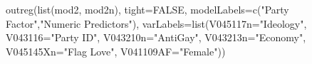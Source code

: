 \begin{Schunk}
\begin{Sinput}
 outreg(list(mod2, mod2n), tight=FALSE, modelLabels=c("Party Factor","Numeric Predictors"), varLabels=list(V045117n="Ideology", V043116="Party ID", V043210n="AntiGay", V043213n="Economy", V045145Xn="Flag Love", V041109AF="Female"))
\end{Sinput}
\end{Schunk}
